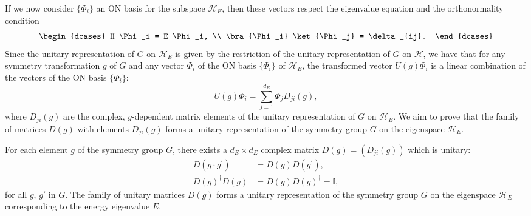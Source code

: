 If we now consider \( \{ \Phi_i \} \) an ON basis for the subspace \(\mathcal{H}_E\), then these vectors respect the eigenvalue equation and the orthonormality condition
\[
    \begin{dcases}
        H \Phi_i = E \Phi_i, \\
        \bra{\Phi_i} \ket{\Phi_j} = \delta_{ij}.
    \end{dcases}
\]
Since the unitary representation of \(G\) on \(\mathcal{H}_E\) is given by the restriction of the unitary representation of \(G\) on \(\mathcal{H}\), we have that for any symmetry transformation \(g\) of \(G\) and any vector \(\Phi_i\) of the ON basis \(\{\Phi_i\}\) of \(\mathcal{H}_E\), the transformed vector \(U(g)\Phi_i\) is a linear combination of the vectors of the ON basis \(\{\Phi_i\}\):
\begin{equation}
    U(g)\Phi_i = \sum_{j=1}^{d_E} \Phi_j D_{ji}(g),
    \label{eq:unitary_representation_eigenspace_linear_combination_definition}
\end{equation}
where \(D_{ji}(g)\) are the complex, \(g\)-dependent matrix elements of the unitary representation of \(G\) on \(\mathcal{H}_E\). We aim to prove that the family of matrices \(D(g)\) with elements \(D_{ji}(g)\) forms a unitary representation of the symmetry group \(G\) on the eigenspace \(\mathcal{H}_E\).
\begin{proposition}
    For each element \(g\) of the symmetry group \(G\), there exists a \(d_E \times d_E\) complex matrix \(D(g) = (D_{ji}(g))\) which is unitary:
    \begin{equation}
        \begin{aligned}
            D(g \cdot g^{\prime}) & = D(g) D(g^{\prime}),               \\
            D(g)^{\dagger} D(g)   & = D(g) D(g)^{\dagger} = \mathbb{I},
        \end{aligned}
        \label{eq:unitary_representation_eigenspace_definition}
    \end{equation}
    for all \(g\), \(g'\) in \(G\). The family of unitary matrices \(D(g)\) forms a unitary representation of the symmetry group \(G\) on the eigenspace \(\mathcal{H}_E\) corresponding to the energy eigenvalue \(E\).
\end{proposition}

